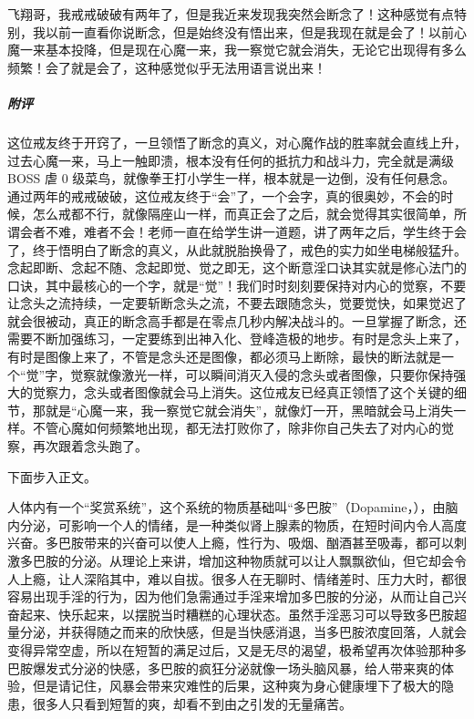 \begin{case}
    飞翔哥，我戒戒破破有两年了，但是我近来发现我突然会断念了！这种感觉有点特别，我以前一直看你说断念，但是始终没有悟出来，但是我现在就是会了！以前心魔一来基本投降，但是现在心魔一来，我一察觉它就会消失，无论它出现得有多么频繁！会了就是会了，这种感觉似乎无法用语言说出来！
    \subparagraph{附评} 这位戒友终于开窍了，一旦领悟了断念的真义，对心魔作战的胜率就会直线上升，过去心魔一来，马上一触即溃，根本没有任何的抵抗力和战斗力，完全就是满级 BOSS 虐 0 级菜鸟，就像拳王打小学生一样，根本就是一边倒，没有任何悬念。通过两年的戒戒破破，这位戒友终于“会”了，一个会字，真的很奥妙，不会的时候，怎么戒都不行，就像隔座山一样，而真正会了之后，就会觉得其实很简单，所谓会者不难，难者不会！老师一直在给学生讲一道题，讲了两年之后，学生终于会了，终于悟明白了断念的真义，从此就脱胎换骨了，戒色的实力如坐电梯般猛升。念起即断、念起不随、念起即觉、觉之即无，这个断意淫口诀其实就是修心法门的口诀，其中最核心的一个字，就是“觉”！我们时时刻刻要保持对内心的觉察，不要让念头之流持续，一定要斩断念头之流，不要去跟随念头，觉要觉快，如果觉迟了就会很被动，真正的断念高手都是在零点几秒内解决战斗的。一旦掌握了断念，还需要不断加强练习，一定要练到出神入化、登峰造极的地步。有时是念头上来了，有时是图像上来了，不管是念头还是图像，都必须马上断除，最快的断法就是一个“觉”字，觉察就像激光一样，可以瞬间消灭入侵的念头或者图像，只要你保持强大的觉察力，念头或者图像就会马上消失。这位戒友已经真正领悟了这个关键的细节，那就是“心魔一来，我一察觉它就会消失”，就像灯一开，黑暗就会马上消失一样。不管心魔如何频繁地出现，都无法打败你了，除非你自己失去了对内心的觉察，再次跟着念头跑了。
\end{case}

下面步入正文。

人体内有一个“奖赏系统”，这个系统的物质基础叫“多巴胺”（Dopamine，），由脑内分泌，可影响一个人的情绪，是一种类似肾上腺素的物质，在短时间内令人高度兴奋。多巴胺带来的兴奋可以使人上瘾，性行为、吸烟、酗酒甚至吸毒，都可以刺激多巴胺的分泌。从理论上来讲，增加这种物质就可以让人飘飘欲仙，但它却会令人上瘾，让人深陷其中，难以自拔。很多人在无聊时、情绪差时、压力大时，都很容易出现手淫的行为，因为他们急需通过手淫来增加多巴胺的分泌，从而让自己兴奋起来、快乐起来，以摆脱当时糟糕的心理状态。虽然手淫恶习可以导致多巴胺超量分泌，并获得随之而来的欣快感，但是当快感消退，当多巴胺浓度回落，人就会变得异常空虚，所以在短暂的满足过后，又是无尽的渴望，极希望再次体验那种多巴胺爆发式分泌的快感，多巴胺的疯狂分泌就像一场头脑风暴，给人带来爽的体验，但是请记住，风暴会带来灾难性的后果，这种爽为身心健康埋下了极大的隐患，很多人只看到短暂的爽，却看不到由之引发的无量痛苦。

